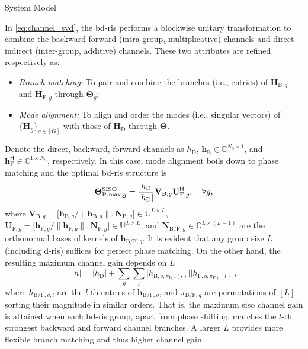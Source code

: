 \documentclass[journal]{IEEEtran}
\begin{document}
\begin{section}{System Model}
		\begin{remark}
			In \eqref{eq:channel_svd}, the \gls{bd}-\gls{ris} performs a blockwise unitary transformation to combine the backward-forward (intra-group, multiplicative) channels and direct-indirect (inter-group, additive) channels.
			These two attributes are refined respectively as:
			\begin{itemize}
				\item \emph{Branch matching:} To pair and combine the branches (i.e., entries) of $\mathbf{H}_{\mathrm{B},g}$ and $\mathbf{H}_{\mathrm{F},g}$ through $\mathbf{\Theta}_g$;
				\item \emph{Mode alignment:} To align and order the modes (i.e., singular vectors) of $\{\mathbf{H}_g\}_{g \in [G]}$ with those of $\mathbf{H}_\mathrm{D}$ through $\mathbf{\Theta}$.
			\end{itemize}
		\end{remark}

		\begin{example}
			\label{eg:siso}
			Denote the direct, backward, forward channels as $h_\mathrm{D}$, $\mathbf{h}_\mathrm{B} \in \mathbb{C}^{N_\mathrm{S} \times 1}$, and $\mathbf{h}_\mathrm{F}^\mathsf{H} \in \mathbb{C}^{1 \times N_\mathrm{S}}$, respectively.
			In this case, mode alignment boils down to phase matching and the optimal \gls{bd}-\gls{ris} structure is
			\begin{equation}
				\mathbf{\Theta}_{\textnormal{P-max},g}^\textnormal{SISO} = \frac{h_\mathrm{D}}{\lvert h_\mathrm{D} \rvert} \mathbf{V}_{\mathrm{B},g} \mathbf{U}_{\mathrm{F},g}^\mathsf{H}, \quad \forall g,
			\end{equation}
			where $\mathbf{V}_{\mathrm{B},g} = \bigl[\mathbf{h}_{\mathrm{B},g}/\lVert \mathbf{h}_{\mathrm{B},g} \rVert, \mathbf{N}_{\mathrm{B},g}\bigr] \in \mathbb{U}^{L \times L}$, $\mathbf{U}_{\mathrm{F},g} = \bigl[\mathbf{h}_{\mathrm{F},g}/\lVert \mathbf{h}_{\mathrm{F},g} \rVert, \mathbf{N}_{\mathrm{F},g}\bigr] \in \mathbb{U}^{L \times L}$, and $\mathbf{N}_{\mathrm{B/F},g} \in \mathbb{C}^{L \times (L-1)}$ are the orthonormal bases of kernels of $\mathbf{h}_{\mathrm{B/F},g}$.
			It is evident that any group size $L$ (including \gls{d}-\gls{ris}) suffices for perfect phase matching.
			On the other hand, the resulting maximum channel gain depends on $L$
			\begin{equation}
				\ \lvert h \rvert = \lvert h_\mathrm{D} \rvert + \sum_g \sum_l \lvert h_{\mathrm{B},g,\pi_{\mathrm{B},g}(l)} \rvert \lvert h_{\mathrm{F},g,\pi_{\mathrm{F},g}(l)} \rvert,
			\end{equation}
			where $h_{\mathrm{B/F},g,l}$ are the $l$-th entries of $\mathbf{h}_{\mathrm{B/F},g}$, and $\pi_{\mathrm{B/F},g}$ are permutations of $[L]$ sorting their magnitude in similar orders.
			That is, the maximum \gls{siso} channel gain is attained when each \gls{bd}-\gls{ris} group, apart from phase shifting, matches the $l$-th strongest backward and forward channel branches.
			A larger $L$ provides more flexible branch matching and thus higher channel gain.
		\end{example}


\end{section}
\end{document}
